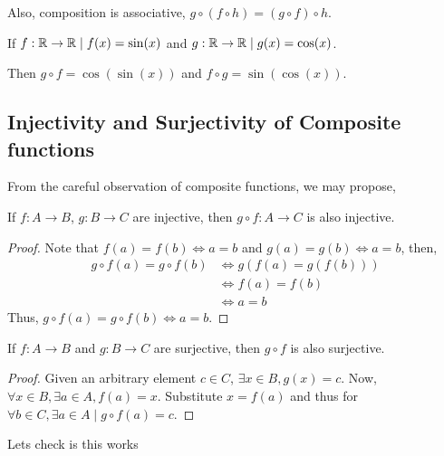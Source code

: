 Also, composition is associative, \(g \circ (f \circ h) = (g \circ f) \circ h\). 

\begin{example}
    If \(f : \mathbb R \to \mathbb R \mid f(x) = \sin(x)\) and \(g : \mathbb R \to \mathbb R \mid g(x) = \cos(x)\).

    Then \(g \circ f = \cos(\sin(x))\) and \(f \circ g = \sin(\cos(x))\). 
\end{example}

\subsection{Injectivity and Surjectivity of Composite functions}

From the careful observation of composite functions, we may propose,

\begin{proposition}
    If \(f : A \to B\), \(g : B \to C\) are injective, then \(g \circ f : A \to C\) is also injective.
\end{proposition}

\begin{proof}
    Note that \(f(a) = f(b) \iff a = b\) and \(g(a) = g(b) \iff a = b\), then,
    \begin{align*}
        g \circ f (a) = g \circ f(b) &\iff g(f(a) = g(f(b)))\\
        &\iff f(a) = f(b) \\
        & \iff a = b 
    \end{align*}  
    Thus, \(g \circ f (a) = g \circ f (b) \iff a = b\).  
\end{proof}

\begin{proposition}
    If \(f : A \to B\) and \(g : B \to C\) are surjective, then \(g \circ f \) is also surjective.
\end{proposition}

\begin{proof}
    Given an arbitrary element \(c \in C\), \(\exists x \in B, g(x) = c\). Now,
    \(\forall x \in B, \exists a \in A, f(a) = x\). Substitute \(x = f(a)\) and thus
    for \(\forall b \in C, \exists a \in A \mid g \circ f (a) = c\).
\end{proof}

Lets check is this works